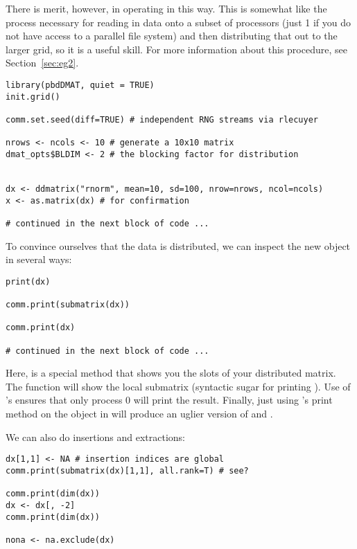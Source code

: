 There is merit, however, in operating in this way.  This is somewhat like the process necessary for reading in data onto a subset of processors (just 1 if you do not have access to a parallel file system) and then distributing that out to the larger grid, so it is a useful skill.  For more information about this procedure, see Section~\ref{sec:eg2}.

\begin{lstlisting}[language=rr,title=Generating Test Data]
library(pbdDMAT, quiet = TRUE)
init.grid()

comm.set.seed(diff=TRUE) # independent RNG streams via rlecuyer

nrows <- ncols <- 10 # generate a 10x10 matrix
dmat_opts$BLDIM <- 2 # the blocking factor for distribution


dx <- ddmatrix("rnorm", mean=10, sd=100, nrow=nrows, ncol=ncols)
x <- as.matrix(dx) # for confirmation

# continued in the next block of code ...
\end{lstlisting}

To convince ourselves that the data is distributed, we can inspect the new object in several ways:

\begin{lstlisting}[language=rr,title=Printing the Object]
print(dx)

comm.print(submatrix(dx))

comm.print(dx)
 
# continued in the next block of code ...
\end{lstlisting}

Here,  is a special method that shows you the slots of your distributed matrix.  The  function will show the local submatrix (syntactic sugar for printing ).  Use of 's  ensures that only process 0 will print the result.  Finally, just using 's print method on the object in  will produce an uglier version of  and .

We can also do insertions and extractions:

\begin{lstlisting}[language=rr,title=Insertion and Extraction]
dx[1,1] <- NA # insertion indices are global
comm.print(submatrix(dx)[1,1], all.rank=T) # see?

comm.print(dim(dx))
dx <- dx[, -2]
comm.print(dim(dx))

nona <- na.exclude(dx)
\end{lstlisting}

